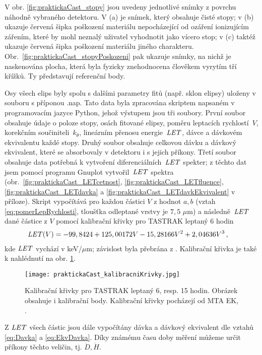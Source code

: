V obr. \ref{fig:praktickaCast_stopy} jsou uvedeny jednotlivé snímky z povrchu náhodně vybraného detektoru. V (a) je snímek, který obsahuje čisté stopy; v (b) ukazuje červená šipka poškození materiálu nepocházející od ozáření ionizujícím zářením, které by mohl neznalý uživatel vyhodnotit jako vícero stop; v (c) taktéž ukazuje červená šipka poškození materiálu jiného charakteru. Obr.~\ref{fig:praktickaCast_stopyPoskozeni} pak ukazuje snímky, na nichž je naskenována plocha, která byla fyzicky znehodnocena člověkem vyrytím tří křížků. Ty představují referenční body. 

Osy všech elips byly spolu s dalšími parametry fitů (např. sklon elipsy) uloženy v souboru s příponou .nap. Tato data byla zpracována skriptem napsaném v programovacím jazyce Python, jehož výstupem jsou tři soubory. První soubor obsahuje údaje o poloze stopy, osách fitované elipsy, poměru leptacích rychlostí~$V$, korekčním součiniteli~$k_{\theta}$, lineárním přenosu energie~$\mathit{LET}$, dávce a dávkovém ekvivalentu každé stopy. Druhý soubor obsahuje celkovou dávku a dávkový ekvivalent, které se absorbovaly v detektoru i s jejich příkony. Třetí soubor obsahuje data potřebná k vytvoření diferenciálních~$\mathit{LET}$ spekter; z těchto dat jsem pomocí programu Gnuplot vytvořil~$\mathit{LET}$ spektra (obr.~\ref{fig:praktickaCast_LETcetnost}, \ref{fig:praktickaCast_LETfluence},
\ref{fig:praktickaCast_LETdavka} a \ref{fig:praktickaCast_LETdavkEkvivalent} v příloze). Skript vypočítává pro každou částici $V$ z hodnot $a,b$ (vztah \eqref{eq:pomerLepRychlosti}, tloušťka odleptané vrstvy je $7,5$
$\mu$m) a následně~$\mathit{LET}$ dané částice z $V$ pomocí kalibrační křivky pro TASTRAK leptaný 6 hodin
\begin{align}
  \mathit{LET}(V) &= -99,8424+125,00172  V-15,28166  V^2+2,04636  V^3\,,\label{eq:kalibracniKrivkaSestHod}
\end{align}
kde $\mathit{LET}$ vychází v keV/$\mu$m; závislost byla přebrána z \cite{ssntd}. Kalibrační křivka je také k nahlédnutí na obr. \ref{fig:praktickaCast_kalibracniKrivky}.
\begin{figure}[ht]
  \centering
  \texttt{[image: praktickaCast\_kalibracniKrivky.jpg]}
  \caption{Kalibrační křivky pro TASTRAK leptaný 6, resp. 15 hodin. Obrázek obsahuje i kalibrační body. Kalibrační křivky pocházejí od MTA EK, \cite{ssntd}.}
  \label{fig:praktickaCast_kalibracniKrivky}
\end{figure}
Z $\mathit{LET}$ všech částic jsou dále vypočítány dávka a dávkový ekvivalent dle vztahů \eqref{eq:Davka} a \eqref{eq:EkvDavka}. Díky známému času doby měření můžeme určit příkony těchto veličin, tj. $\dot{D}, \dot{H}$.

